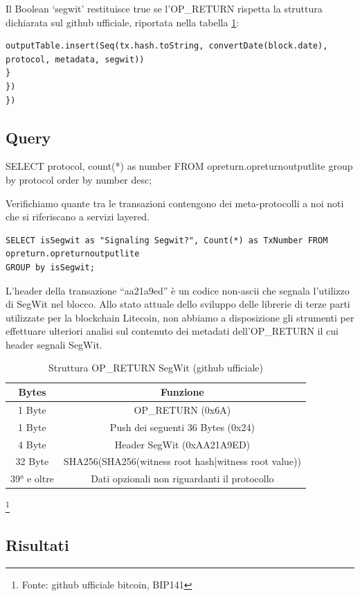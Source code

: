 Il Boolean ‘segwit’ restituisce true se l’OP\_RETURN rispetta la struttura dichiarata sul github ufficiale, riportata nella tabella \ref{seg}:


\begin{lstlisting}
outputTable.insert(Seq(tx.hash.toString, convertDate(block.date), protocol, metadata, segwit))
}
})
})
\end{lstlisting}
\subsection{Query}

SELECT protocol, count(*) as number FROM opreturn.opreturnoutputlite
group by protocol order by number desc;

Verifichiamo quante tra le transazioni contengono dei meta-protocolli a noi noti che si riferiscano a servizi layered.

\begin{lstlisting}
SELECT isSegwit as "Signaling Segwit?", Count(*) as TxNumber FROM opreturn.opreturnoutputlite
GROUP by isSegwit;
\end{lstlisting}

L’header della transazione “aa21a9ed” è un codice non-ascii che segnala l’utilizzo di SegWit nel blocco. Allo stato attuale dello sviluppo delle librerie di terze parti utilizzate per la blockchain Litecoin, non abbiamo a disposizione gli strumenti per effettuare ulteriori analisi sul contenuto dei metadati dell’OP\_RETURN il cui header segnali SegWit.

\begin{table}
	\begin{tabular}{c|c}
		\textbf{Bytes} & \textbf{Funzione} \\ 
		\hline 
		1 Byte	& OP\_RETURN (0x6A) \\ 
		\hline 
		1 Byte	& Push dei seguenti 36 Bytes (0x24) \\ 
		\hline 
		4 Byte	& Header SegWit (0xAA21A9ED) \\ 
		\hline 
		32 Byte	& SHA256(SHA256(witness root hash|witness root value)) \\ 
		\hline 
		39° e oltre	&  Dati opzionali non riguardanti il protocollo\\ 
		\hline
	\end{tabular}
	\caption{Struttura OP\_RETURN SegWit (github ufficiale)}
	\label{seg}
	\footnote{Fonte: github ufficiale bitcoin, BIP141}
\end{table} 

\subsection{Risultati}

